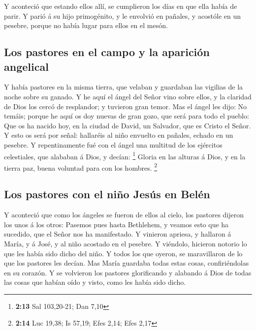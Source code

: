  Y aconteció que estando ellos allí, se cumplieron los días
en que ella había de parir.  Y parió á su hijo primogénito,
y le envolvió en pañales, y acostóle en un pesebre, porque no había
lugar para ellos en el mesón.

\hypertarget{los-pastores-en-el-campo-y-la-apariciuxf3n-angelical}{%
\subsection{Los pastores en el campo y la aparición
angelical}\label{los-pastores-en-el-campo-y-la-apariciuxf3n-angelical}}

 Y había pastores en la misma tierra, que velaban y
guardaban las vigilias de la noche sobre su ganado.  Y he
aquí el ángel del Señor vino sobre ellos, y la claridad de Dios los
cercó de resplandor; y tuvieron gran temor.  Mas el ángel
les dijo: No temáis; porque he aquí os doy nuevas de gran gozo, que será
para todo el pueblo:  Que os ha nacido hoy, en la ciudad de
David, un Salvador, que es Cristo el Señor.  Y esto os será
por señal: hallaréis al niño envuelto en pañales, echado en un pesebre.
 Y repentinamente fué con el ángel una multitud de los
ejércitos celestiales, que alababan á Dios, y decían: \footnote{\textbf{2:13}
  Sal 103,20-21; Dan 7,10}  Gloria en las alturas á Dios, y
en la tierra paz, buena voluntad para con los hombres. \footnote{\textbf{2:14}
  Luc 19,38; Is 57,19; Efes 2,14; Efes 2,17}

\hypertarget{los-pastores-con-el-niuxf1o-jesuxfas-en-beluxe9n}{%
\subsection{Los pastores con el niño Jesús en
Belén}\label{los-pastores-con-el-niuxf1o-jesuxfas-en-beluxe9n}}

 Y aconteció que como los ángeles se fueron de ellos al
cielo, los pastores dijeron los unos á los otros: Pasemos pues hasta
Bethlehem, y veamos esto que ha sucedido, que el Señor nos ha
manifestado.  Y vinieron apriesa, y hallaron á María, y á
José, y al niño acostado en el pesebre.  Y viéndolo,
hicieron notorio lo que les había sido dicho del niño.  Y
todos los que oyeron, se maravillaron de lo que los pastores les decían.
 Mas María guardaba todas estas cosas, confiriéndolas en su
corazón.  Y se volvieron los pastores glorificando y
alabando á Dios de todas las cosas que habían oído y visto, como les
había sido dicho.

